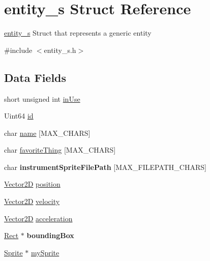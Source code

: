 \hypertarget{structentity__s}{}\section{entity\+\_\+s Struct Reference}
\label{structentity__s}


\hyperlink{structentity__s}{entity\+\_\+s} Struct that represents a generic entity  




{\ttfamily \#include $<$entity\+\_\+s.\+h$>$}

\subsection*{Data Fields}
\begin{DoxyCompactItemize}
\item 
short unsigned int \hyperlink{structentity__s_a13159f6b47122dc47eb11b1653a1663a}{in\+Use}
\item 
Uint64 \hyperlink{structentity__s_a4158e9a3af9337e59f9b8de984c0efba}{id}
\item 
char \hyperlink{structentity__s_a1a416c8de05eed27aa81f653426597d8}{name} \mbox{[}M\+A\+X\+\_\+\+C\+H\+A\+RS\mbox{]}
\item 
char \hyperlink{structentity__s_ae0b5157d90563d37e8209f8ba094e494}{favorite\+Thing} \mbox{[}M\+A\+X\+\_\+\+C\+H\+A\+RS\mbox{]}
\item 
\mbox{\label{structentity__s_ae526c5db6c94436bd908917383cd3b2b}} 
char {\bfseries instrument\+Sprite\+File\+Path} \mbox{[}M\+A\+X\+\_\+\+F\+I\+L\+E\+P\+A\+T\+H\+\_\+\+C\+H\+A\+RS\mbox{]}
\item 
\hyperlink{struct_vector2_d}{Vector2D} \hyperlink{structentity__s_a2dc349a13930beaf26472e0d04d9563e}{position}
\item 
\hyperlink{struct_vector2_d}{Vector2D} \hyperlink{structentity__s_a5b7790a4c9666f321ce2228f1b8bd118}{velocity}
\item 
\hyperlink{struct_vector2_d}{Vector2D} \hyperlink{structentity__s_af4d83cb71edc9f387519fb3c7669f9bd}{acceleration}
\item 
\mbox{\label{structentity__s_a3d49780e142d5f067cdd71be48ad284d}} 
\hyperlink{structrect__s}{Rect} $\ast$ {\bfseries bounding\+Box}
\item 
\hyperlink{struct_sprite___s}{Sprite} $\ast$ \hyperlink{structentity__s_a09530f21303b5dbd659855de69a51e0c}{my\+Sprite}

\end{DoxyCompactItemize}
